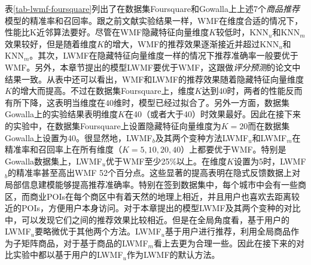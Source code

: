 表\ref{tab-lwmf-foursquare}列出了在数据集Foursquare和Gowalla上上述7个\textit{商品推荐}模型的精准率和召回率。跟之前文献实验结果一样，WMF在维度合适的情况下，性能比K近邻算法要好。尽管在WMF隐藏特征向量维度$K$较低时，KNN$_u$和KNN$_m$效果较好，但是随着维度$K$的增大，WMF的推荐效果逐渐接近并超过KNN$_u$和KNN$_m$。其次，LWMF在隐藏特征向量维度一样的情况下推荐准确率一般要优于WMF。另外，本章节提出的模型LWMF要优于WMF，这跟做\textit{评分预测}的论文\cite{lee2013local}中结果一致。从表中还可以看出，WMF和LWMF的推荐效果随着隐藏特征向量维度$K$的增大而提高。不过在数据集Foursquare上，维度$K$达到40时，两者的性能反而有所下降，这表明当维度在$40$维时，模型已经过拟合了。另外一方面，数据集Gowalla上的实验结果表明维度$K$在40（或者大于40）时效果最好。因此在接下来的实验中，在数据集Foursquare上设置隐藏特征向量维度为$K=20$而在数据集Gowalla上设置为40。很显然地，LWMF$_b$及其两个变种方法LWMF$_u$和LWMF$_m$在精准率和召回率上在所有维度（$K=5,10,20, 40$）上都要优于WMF。特别是Gowalla数据集上，LWMF$_u$优于WMF至少25\%以上。在维度$K$设置为5时，LWMF$_{b}$的精准率甚至高出WMF 52个百分点。这些显著的提高表明在隐式反馈数据上对局部信息建模能够提高推荐准确率。特别在签到数据集中，每个城市中会有一些商区，而商业POIs在每个商区中有着天然的地理上相近，并且用户也喜欢去距离较近的POIs，方便用户本身访问。对于本章提出的模型LWMF及其两个变种的对比中，可以发现它们之间的推荐效果比较相近。但是在全局角度看，基于用户的LWMF$_u$要略微优于其他两个方法。LWMF$_u$基于用户进行推荐，利用全局商品作为子矩阵商品，对于基于商品的LWMF$_m$看上去更为合理一些。因此在接下来的对比实验中都以基于用户的LWMF$_u$作为LWMF的默认方法。

